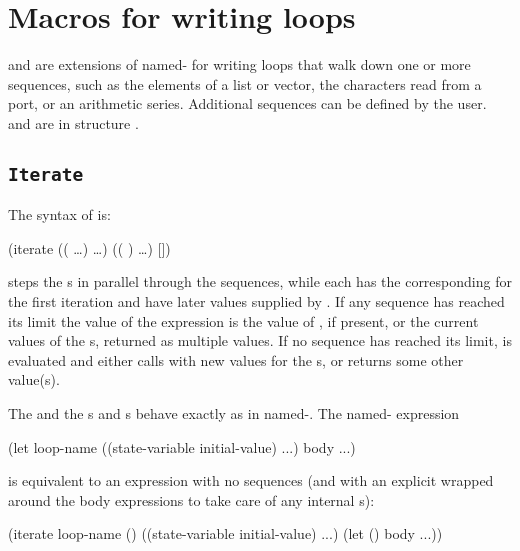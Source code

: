 \section{Macros for writing loops}

 and  are extensions of named- for
 writing loops that walk down one or more sequences,
 such as the elements of a list or vector, the
 characters read from a port, or an arithmetic series.
Additional sequences can be defined by the user.
 and  are in structure .

\subsection{{\tt Iterate}}

The syntax of  is:
\begin{example}
  (iterate 
           ((   \ldots)
            \ldots)
           (( )
            \ldots)
    [])
\end{example}

 steps the s in parallel through the
 sequences, while each  has the corresponding
  for the first iteration and have later values
 supplied by . 
If any sequence has reached its limit the value of the 
 expression is
 the value of , if present, or the current values of
 the s, returned as multiple values.
If no sequence has reached
 its limit,  is evaluated and either calls  with
 new values for the s, or returns some other value(s).

The  and the s and s behave
exactly as in named-.  The named- expression
\begin{example}
  (let loop-name ((state-variable initial-value) ...)
    body ...)
\end{example}
is equivalent to an  expression with no sequences
 (and with an explicit
  wrapped around the body expressions to take care of any
 internal s):
\begin{example}
  (iterate loop-name
           ()
           ((state-variable initial-value) ...)
    (let () body ...))
\end{example}

